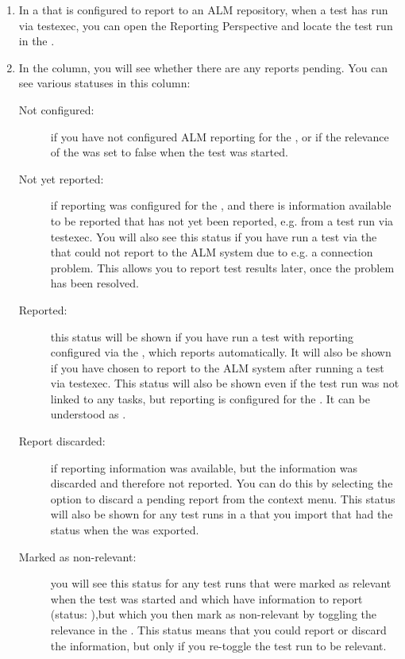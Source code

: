 \begin{enumerate}
\item In a \gdproject{} that is configured to report to an ALM repository, when a test has run via testexec, you can open the Reporting Perspective and locate the test run in the \gdtestsummaryview{}.
\item In the  column, you will see whether there are any reports pending. You can see various statuses in this column:

\begin{description}
\item [Not configured:]{if you have not configured ALM reporting for the \gdproject{}, or if the relevance of the \gdsuite{} was set to false when the test was started.}
\item [Not yet reported:]{if reporting was configured for the \gdproject{}, and there is information available to be reported that has not yet been reported, e.g. from a test run via testexec. You will also see this status if you have run a test via the \ite{} that could not report to the ALM system due to e.g. a connection problem. This allows you to report test results later, once the problem has been resolved.}
\item [Reported:]{this status will be shown if you have run a test with reporting configured via the \ite{}, which reports automatically. It will also be shown if you have chosen to report to the ALM system after running a test via testexec. This status will also be shown even if the test run was not linked to any tasks, but reporting is configured for the \gdproject{}. It can be understood as .}
\item [Report discarded:]{if reporting information was available, but the information was discarded and therefore not reported. You can do this by selecting the option to discard a pending report from the context menu. This status will also be shown for any test runs in a \gdproject{} that you import that had the status  when the \gdproject{} was exported.}
\item [Marked as non-relevant:]{you will see this status for any test runs that were marked as relevant when the test was started and which have information to report (status: ),but which you then mark as non-relevant by toggling the relevance in the \gdtestsummaryview{}. This status means that you could report or discard the information, but only if you re-toggle the test run to be relevant.}

\end{description}
\end{enumerate}
